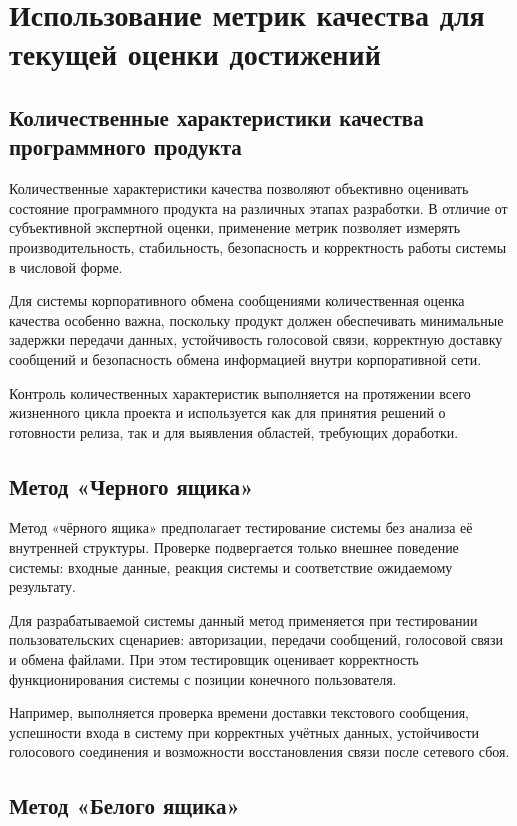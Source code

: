 \documentclass[14pt,a4paper]{extarticle}
\begin{document}
\section{Использование метрик качества для текущей оценки достижений}

\subsection{Количественные характеристики качества программного продукта}

Количественные характеристики качества позволяют объективно оценивать состояние программного продукта на различных этапах разработки. В отличие от субъективной экспертной оценки, применение метрик позволяет измерять производительность, стабильность, безопасность и корректность работы системы в числовой форме.

Для системы корпоративного обмена сообщениями количественная оценка качества особенно важна, поскольку продукт должен обеспечивать минимальные задержки передачи данных, устойчивость голосовой связи, корректную доставку сообщений и безопасность обмена информацией внутри корпоративной сети.

Контроль количественных характеристик выполняется на протяжении всего жизненного цикла проекта и используется как для принятия решений о готовности релиза, так и для выявления областей, требующих доработки.

\subsection{Метод «Черного ящика»}

Метод «чёрного ящика» предполагает тестирование системы без анализа её внутренней структуры. Проверке подвергается только внешнее поведение системы: входные данные, реакция системы и соответствие ожидаемому результату.

Для разрабатываемой системы данный метод применяется при тестировании пользовательских сценариев: авторизации, передачи сообщений, голосовой связи и обмена файлами. При этом тестировщик оценивает корректность функционирования системы с позиции конечного пользователя.

Например, выполняется проверка времени доставки текстового сообщения, успешности входа в систему при корректных учётных данных, устойчивости голосового соединения и возможности восстановления связи после сетевого сбоя.

\subsection{Метод «Белого ящика»}
\end{document}
